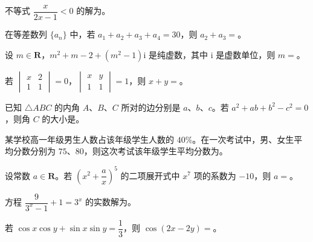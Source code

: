 \begin{question}
不等式 $\dfrac{x}{2x-1}<0$ 的解为\gkblank{}。

\end{question}
\begin{question}
在等差数列 $\{a_n\}$ 中，若 $a_1+a_2+a_3+a_4=30$，则 $a_2+a_3=$\gkblank{}。

\end{question}
\begin{question}
设 $m\in\mathbf R$，$m^2+m-2+(m^2-1)\mathrm i$ 是纯虚数，其中 $\mathrm i$ 是虚数单位，则 $m=$\gkblank{}。

\end{question}
\begin{question}
若 $\begin{vmatrix}x&2\\1&1\end{vmatrix}=0$，$\begin{vmatrix}x&y\\1&1\end{vmatrix}=1$，则 $x+y=$\gkblank{}。

\end{question}
\begin{question}
已知 $\triangle ABC$ 的内角 $A$、$B$、$C$ 所对的边分别是 $a$、$b$、$c$。若 $a^2+ab+b^2-c^2=0$，则角 $C$ 的大小是\gkblank{}。

\end{question}
\begin{question}
某学校高一年级男生人数占该年级学生人数的 $40\%$。在一次考试中，男、女生平均分数分别为 $75$、$80$，则这次考试该年级学生平均分数为\gkblank{}。

\end{question}
\begin{question}
设常数 $a\in\mathbf R$。若 $\left(x^2+\dfrac ax\right)^5$ 的二项展开式中 $x^7$ 项的系数为 $-10$，则 $a=$\gkblank{}。

\end{question}
\begin{question}
方程 $\dfrac{9}{3^x-1}+1=3^x$ 的实数解为\gkblank{}。

\end{question}
\begin{question}
若 $\cos x\cos y+\sin x\sin y=\dfrac13$，则 $\cos(2x-2y)=$\gkblank{}。

\Needspace{0.4\textheight}
\end{question}
\begingroup
\renewenvironment{question}{\Needspace{0.25\textheight}}{}
